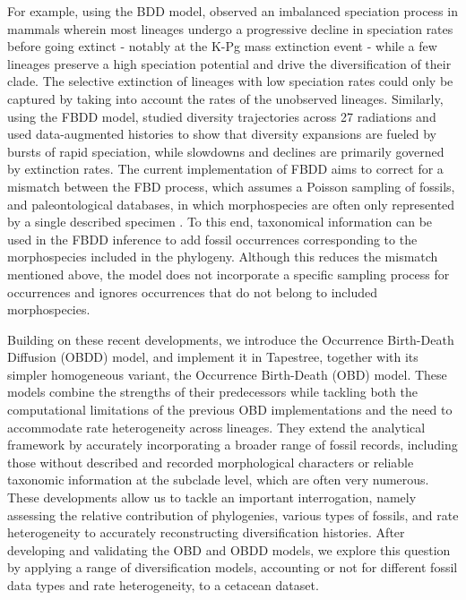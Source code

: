 \documentclass[oupdraft]{sysbio}
\begin{document}
For example, using the BDD model, \citet{quintero_imbalanced_2024} observed an imbalanced speciation process in mammals wherein most lineages undergo a progressive decline in speciation rates before going extinct - notably at the K-Pg mass extinction event - while a few lineages preserve a high speciation potential and drive the diversification of their clade. The selective extinction of lineages with low speciation rates could only be captured by taking into account the rates of the unobserved lineages. Similarly, using the FBDD model, \citet{quintero_rise_2025} studied diversity trajectories across 27 radiations and used data-augmented histories to show that diversity expansions are fueled by bursts of rapid speciation, while slowdowns and declines are primarily governed by extinction rates. The current implementation of FBDD aims to correct for a mismatch between the FBD process, which assumes a Poisson sampling of fossils, and paleontological databases, in which morphospecies are often only represented by a single described specimen \citep{wright_integrating_2022}. To this end, taxonomical information can be used in the FBDD inference to add fossil occurrences corresponding to the morphospecies included in the phylogeny. Although this reduces the mismatch mentioned above, the model does not incorporate a specific sampling process for occurrences and ignores occurrences that do not belong to included morphospecies.

Building on these recent developments, we introduce the Occurrence Birth-Death Diffusion (OBDD) model, and implement it in Tapestree, together with its simpler homogeneous variant, the Occurrence Birth-Death (OBD) model. These models combine the strengths of their predecessors while tackling both the computational limitations of the previous OBD implementations and the need to accommodate rate heterogeneity across lineages. They extend the analytical framework by accurately incorporating a broader range of fossil records, including those without described and recorded morphological characters or reliable taxonomic information at the subclade level, which are often very numerous. These developments allow us to tackle an important interrogation, namely assessing the relative contribution of phylogenies, various types of fossils, and rate heterogeneity to accurately reconstructing diversification histories. After developing and validating the OBD and OBDD models, we explore this question by applying a range of diversification models, accounting or not for different fossil data types and rate heterogeneity, to a cetacean dataset.
\end{document}
